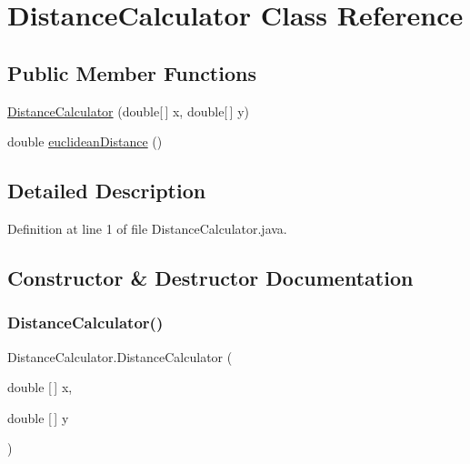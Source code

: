 \hypertarget{class_distance_calculator}{}\section{Distance\+Calculator Class Reference}
\label{class_distance_calculator}
\subsection*{Public Member Functions}
\begin{DoxyCompactItemize}
\item 
\hyperlink{class_distance_calculator_ae6b67de32de1395ecc45d421108b5763}{Distance\+Calculator} (double\mbox{[}$\,$\mbox{]} x, double\mbox{[}$\,$\mbox{]} y)
\item 
double \hyperlink{class_distance_calculator_a1530ee476e59d1da8e59876c16a03f55}{euclidean\+Distance} ()
\end{DoxyCompactItemize}


\subsection{Detailed Description}


Definition at line 1 of file Distance\+Calculator.\+java.



\subsection{Constructor \& Destructor Documentation}
\mbox{\label{class_distance_calculator_ae6b67de32de1395ecc45d421108b5763}} 
\subsubsection{\texorpdfstring{Distance\+Calculator()}{DistanceCalculator()}}
{\footnotesize\ttfamily Distance\+Calculator.\+Distance\+Calculator (\begin{DoxyParamCaption}\item[{double \mbox{[}$\,$\mbox{]}}]{x,  }\item[{double \mbox{[}$\,$\mbox{]}}]{y }\end{DoxyParamCaption})}

